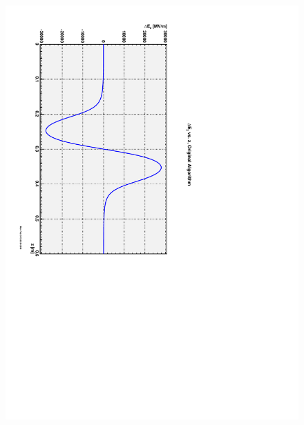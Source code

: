\documentclass{report}
\begin{document}
\begin{figure}[hbt]
{    \includegraphics[scale=0.4,angle=90.0]{field-diff-original-FINLB01-MSLAC.pdf}} \\
  \subfloat[][]{
    \label{Fi:figure-3c}
}
\end{figure}
\end{document}
